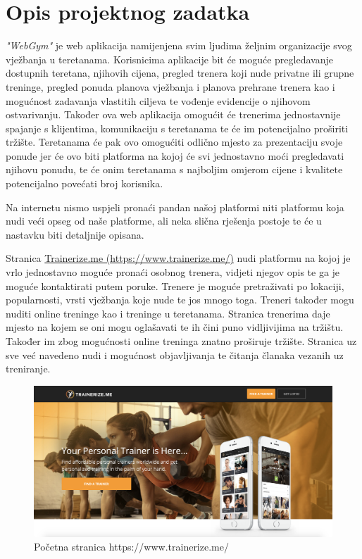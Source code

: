 \chapter{Opis projektnog zadatka}
		
		
		\textit{"WebGym"} je web aplikacija namijenjena svim ljudima željnim organizacije 
		svog vježbanja u teretanama. Korisnicima aplikacije bit će moguće pregledavanje 
		dostupnih teretana, njihovih cijena, pregled trenera koji nude privatne ili grupne 
		treninge, pregled ponuda planova vježbanja i planova prehrane trenera kao i 
		mogućnost zadavanja vlastitih ciljeva te vođenje evidencije o njihovom ostvarivanju.
		Također ova web aplikacija omogućit će trenerima jednostavnije spajanje s klijentima,
		komunikaciju s teretanama te će im potencijalno proširiti tržište. Teretanama će pak 
		ovo omogućiti odlično mjesto za prezentaciju svoje ponude jer će ovo biti platforma 
		na kojoj će svi jednostavno moći pregledavati njihovu ponudu, te će onim teretanama 
		s najboljim omjerom cijene i kvalitete potencijalno povećati broj korisnika. 
		
		\vspace{5mm}
		
		Na internetu nismo uspjeli pronaći pandan našoj platformi niti platformu koja 
		nudi veći opseg od naše platforme, ali neka slična rješenja postoje te će u nastavku 
		biti detaljnije opisana. 
		
		Stranica \href{https://www.trainerize.me/}{Trainerize.me (https://www.trainerize.me/)} nudi platformu na kojoj je vrlo jednostavno moguće pronaći osobnog trenera, vidjeti 
		njegov opis te ga je moguće kontaktirati putem poruke. Trenere je moguće pretraživati po lokaciji, popularnosti, vrsti vježbanja koje nude te jos mnogo toga. 
		Treneri također mogu nuditi online treninge kao i treninge u teretanama. Stranica 
		trenerima daje mjesto na kojem se oni mogu oglašavati te ih čini puno vidljivijima na 
		tržištu. Također im zbog mogućnosti online treninga znatno proširuje tržište. Stranica uz sve već navedeno nudi i mogućnost objavljivanja te čitanja članaka 
		vezanih uz treniranje.
		
		\begin{figure}[H]
			\includegraphics[scale=0.20]{slike/trainerizeme1.PNG} %
			\centering
			\caption{Početna stranica https://www.trainerize.me/}
			\label{fig:promjene}
		\end{figure}
	
